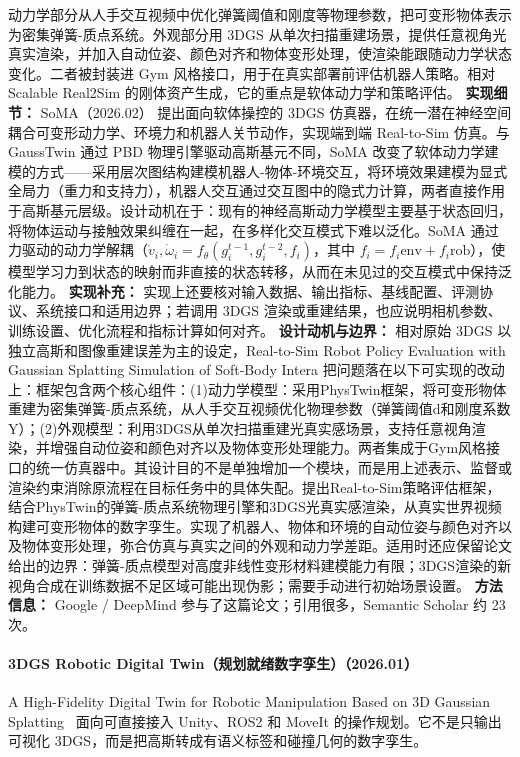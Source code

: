 动力学部分从人手交互视频中优化弹簧阈值和刚度等物理参数，把可变形物体表示为密集弹簧-质点系统。外观部分用 3DGS 从单次扫描重建场景，提供任意视角光真实渲染，并加入自动位姿、颜色对齐和物体变形处理，使渲染能跟随动力学状态变化。二者被封装进 Gym 风格接口，用于在真实部署前评估机器人策略。相对 Scalable Real2Sim 的刚体资产生成，它的重点是软体动力学和策略评估。
\textbf{实现细节：} SoMA（2026.02） 提出面向软体操控的 3DGS 仿真器，在统一潜在神经空间耦合可变形动力学、环境力和机器人关节动作，实现端到端 Real-to-Sim 仿真。与 GaussTwin 通过 PBD 物理引擎驱动高斯基元不同，SoMA 改变了软体动力学建模的方式——采用层次图结构建模机器人-物体-环境交互，将环境效果建模为显式全局力（重力和支持力），机器人交互通过交互图中的隐式力计算，两者直接作用于高斯基元层级。设计动机在于：现有的神经高斯动力学模型主要基于状态回归，将物体运动与接触效果纠缠在一起，在多样化交互模式下难以泛化。SoMA 通过力驱动的动力学解耦（$\dot{v}_i, \dot{\omega}_i = f_\theta(g_i^{t-1}, g_i^{t-2}, f_i)$，其中 $f_i = f_i^{}\mathrm{env} + f_i^{}\mathrm{rob}$），使模型学习力到状态的映射而非直接的状态转移，从而在未见过的交互模式中保持泛化能力。
\textbf{实现补充：} 实现上还要核对输入数据、输出指标、基线配置、评测协议、系统接口和适用边界；若调用 3DGS 渲染或重建结果，也应说明相机参数、训练设置、优化流程和指标计算如何对齐。
\textbf{设计动机与边界：} 相对原始 3DGS 以独立高斯和图像重建误差为主的设定，Real-to-Sim Robot Policy Evaluation with Gaussian Splatting Simulation of Soft-Body Intera 把问题落在以下可实现的改动上：框架包含两个核心组件：(1)动力学模型：采用PhysTwin框架，将可变形物体重建为密集弹簧-质点系统，从人手交互视频优化物理参数（弹簧阈值d和刚度系数Y）；(2)外观模型：利用3DGS从单次扫描重建光真实感场景，支持任意视角渲染，并增强自动位姿和颜色对齐以及物体变形处理能力。两者集成于Gym风格接口的统一仿真器中。其设计目的不是单独增加一个模块，而是用上述表示、监督或渲染约束消除原流程在目标任务中的具体失配。提出Real-to-Sim策略评估框架，结合PhysTwin的弹簧-质点系统物理引擎和3DGS光真实感渲染，从真实世界视频构建可变形物体的数字孪生。实现了机器人、物体和环境的自动位姿与颜色对齐以及物体变形处理，弥合仿真与真实之间的外观和动力学差距。适用时还应保留论文给出的边界：弹簧-质点模型对高度非线性变形材料建模能力有限；3DGS渲染的新视角合成在训练数据不足区域可能出现伪影；需要手动进行初始场景设置。
\textbf{方法信息：} Google / DeepMind 参与了这篇论文；引用很多，Semantic Scholar 约 23 次。



\paragraph{3DGS Robotic Digital Twin（规划就绪数字孪生）（2026.01）}
A High-Fidelity Digital Twin for Robotic Manipulation Based on 3D Gaussian Splatting~\cite{2601_03200} 面向可直接接入 Unity、ROS2 和 MoveIt 的操作规划。它不是只输出可视化 3DGS，而是把高斯转成有语义标签和碰撞几何的数字孪生。

